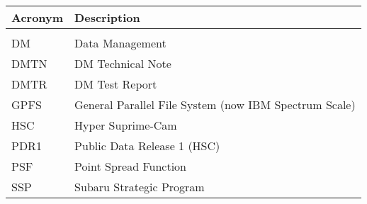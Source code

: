 \addtocounter{table}{-1}
\begin{longtable}{p{}p{}}\hline
\textbf{Acronym} & \textbf{Description}  \\\hline

 &  \\\hline
DM & Data Management \\\hline
DMTN & DM Technical Note \\\hline
DMTR & DM Test Report \\\hline
GPFS & General Parallel File System (now IBM Spectrum Scale) \\\hline
HSC & Hyper Suprime-Cam \\\hline
PDR1 & Public Data Release 1 (HSC) \\\hline
PSF & Point Spread Function \\\hline
SSP & Subaru Strategic Program \\\hline
\end{longtable}
